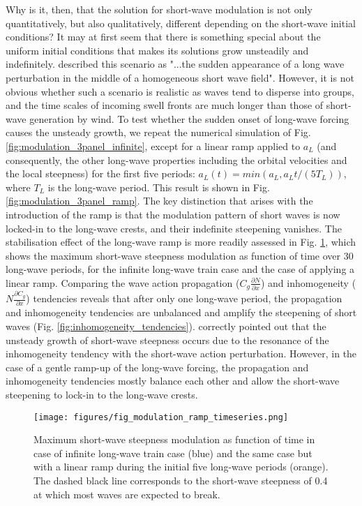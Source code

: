 \documentclass[lineno]{jfm}
\begin{document}
Why is it, then, that the solution for short-wave modulation is not only
quantitatively, but also qualitatively, different depending on the short-wave
initial conditions?
It may at first seem that there is something special about the uniform initial
conditions that makes its solutions grow unsteadily and indefinitely.
\citet{peureux2021unsteady} described this scenario as "...the sudden appearance
of a long wave perturbation in the middle of a homogeneous short wave field".
However, it is not obvious whether such a scenario is realistic as waves tend to
disperse into groups, and the time scales of incoming swell fronts are much
longer than those of short-wave generation by wind.
To test whether the sudden onset of long-wave forcing causes the unsteady growth,
we repeat the numerical simulation of Fig.
\ref{fig:modulation_3panel_infinite}, except for a linear ramp applied to $a_L$
(and consequently, the other long-wave properties including the orbital
velocities and the local steepness) for the first five periods:
$a_L(t) = min(a_L, a_L t / \left(5 T_L\right))$, where $T_L$ is the long-wave period.
This result is shown in Fig. \ref{fig:modulation_3panel_ramp}.
The key distinction that arises with the introduction of the ramp is that the
modulation pattern of short waves is now locked-in to the long-wave crests,
and their indefinite steepening vanishes.
The stabilisation effect of the long-wave ramp is more readily assessed in
Fig. \ref{fig:unsteady_growth_timeseries}, which shows the maximum short-wave
steepness modulation as function of time over 30 long-wave periods, for the
infinite long-wave train case and the case of applying a linear ramp.
Comparing the wave action propagation ($C_g \frac{\partial N}{\partial x}$) and
inhomogeneity ($N \frac{\partial C_g}{\partial x}$) tendencies reveals that
after only one long-wave period, the propagation and inhomogeneity tendencies
are unbalanced and amplify the steepening of short waves
(Fig. \ref{fig:inhomogeneity_tendencies}).
\citet{peureux2021unsteady} correctly pointed out that the unsteady growth of
short-wave steepness occurs due to the resonance of the inhomogeneity
tendency with the short-wave action perturbation.
However, in the case of a gentle ramp-up of the long-wave forcing, the
propagation and inhomogeneity tendencies mostly balance each other and allow
the short-wave steepening to lock-in to the long-wave crests.

\begin{figure}
  \centering
  \texttt{[image: figures/fig\_modulation\_ramp\_timeseries.png]}
  \caption{
    Maximum short-wave steepness modulation as function of time in case of
    infinite long-wave train case (blue) and the same case but with a linear
    ramp during the initial five long-wave periods (orange). The dashed black
    line corresponds to the short-wave steepness of 0.4 at which most waves are
    expected to break.
  }
  \label{fig:unsteady_growth_timeseries}
\end{figure}
\end{document}
